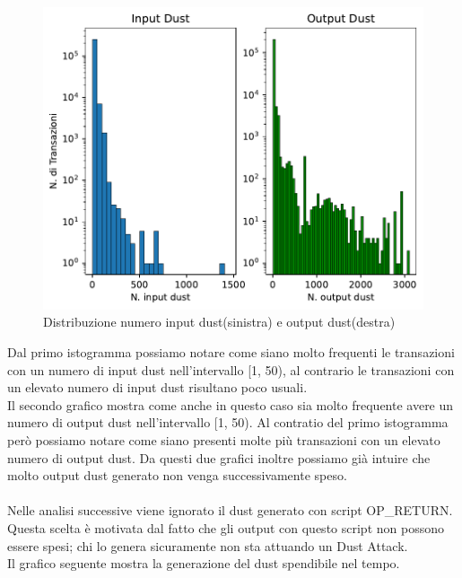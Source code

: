 \begin{figure}[h!]
    \centering
    \includegraphics[scale=0.9]{Grafici/distribuzione_dust.pdf}
    \caption{Distribuzione numero input dust(sinistra) e output dust(destra)}
    \label{fig:dust_distribuzione}
\end{figure}
\FloatBarrier 
Dal primo istogramma possiamo notare come siano molto frequenti le transazioni con un numero di input dust nell'intervallo [1, 50), al contrario le transazioni con un elevato numero di input dust risultano poco usuali.\\
Il secondo grafico mostra come anche in questo caso sia molto frequente avere un numero di output dust nell'intervallo [1, 50). Al contratio del primo istogramma però possiamo notare come siano presenti molte più transazioni con un elevato numero di output dust. Da questi due grafici inoltre possiamo già intuire che molto output dust generato non venga successivamente speso.\\\\ 
Nelle analisi successive viene ignorato il dust generato con script OP\_RETURN. Questa scelta è motivata dal fatto che gli output con questo script non possono essere spesi; chi lo genera sicuramente non sta attuando un Dust Attack.\\
Il grafico seguente mostra la generazione del dust spendibile nel tempo.
